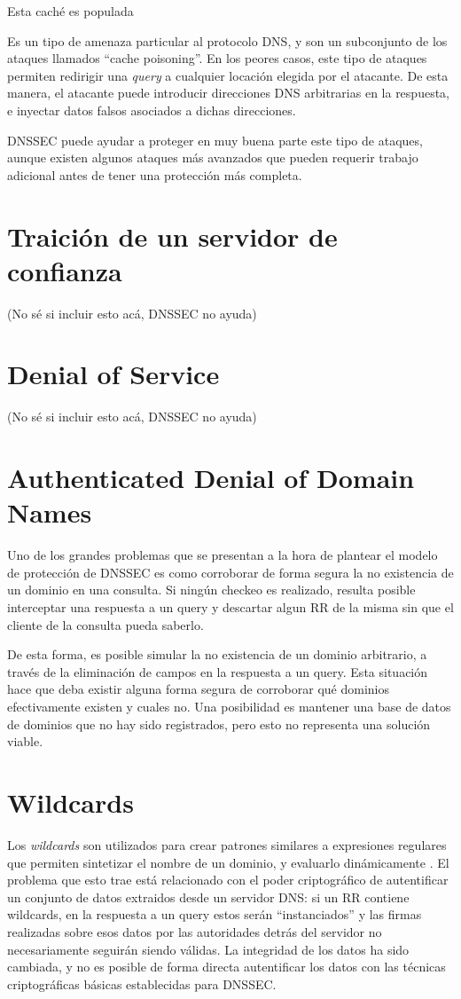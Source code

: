 Esta caché es populada 

Es un tipo de amenaza particular al protocolo DNS, y son un subconjunto de los
ataques llamados ``cache poisoning''. En los peores casos, este tipo de ataques
permiten redirigir una \textit{query} a cualquier locaci\'on elegida por el
atacante. De esta manera, el atacante puede introducir direcciones DNS
arbitrarias en la respuesta, e inyectar datos falsos asociados a dichas
direcciones.

DNSSEC puede ayudar a proteger en muy buena parte este tipo de ataques, aunque
existen algunos ataques m\'as avanzados que pueden requerir trabajo adicional
antes de tener una protecci\'on m\'as completa.

\section{Traici\'on de un servidor de confianza}

(No s\'e si incluir esto ac\'a, DNSSEC no ayuda)

\section{Denial of Service}

(No s\'e si incluir esto ac\'a, DNSSEC no ayuda)

\section{Authenticated Denial of Domain Names}

Uno de los grandes problemas que se presentan a la hora de plantear el modelo
de protección de DNSSEC es como corroborar de forma segura la no existencia de
un dominio en una consulta. Si ningún checkeo es realizado, resulta posible
interceptar una respuesta a un query y descartar algun RR de la misma sin que
el cliente de la consulta pueda saberlo.

De esta forma, es posible simular la no existencia de un dominio arbitrario,
a través de la eliminación de campos en la respuesta a un query. Esta situación
hace que deba existir alguna forma segura de corroborar qué dominios
efectivamente existen y cuales no. Una posibilidad es mantener una base de
datos de dominios que no hay sido registrados, pero esto no representa una
solución viable.

\section{Wildcards}

Los \textit{wildcards} son utilizados para crear patrones similares a
expresiones regulares que permiten sintetizar el nombre de un dominio, y
evaluarlo din\'amicamente \cite{rfc1034}. El problema que esto trae está
relacionado con el poder criptográfico de autentificar un conjunto de datos
extraidos desde un servidor DNS: si un RR contiene wildcards, en la respuesta a
un query estos serán ``instanciados'' y las firmas realizadas sobre esos datos
por las autoridades detrás del servidor no necesariamente seguirán siendo
válidas. La integridad de los datos ha sido cambiada, y no es posible de forma
directa autentificar los datos con las técnicas criptográficas básicas
establecidas para DNSSEC.